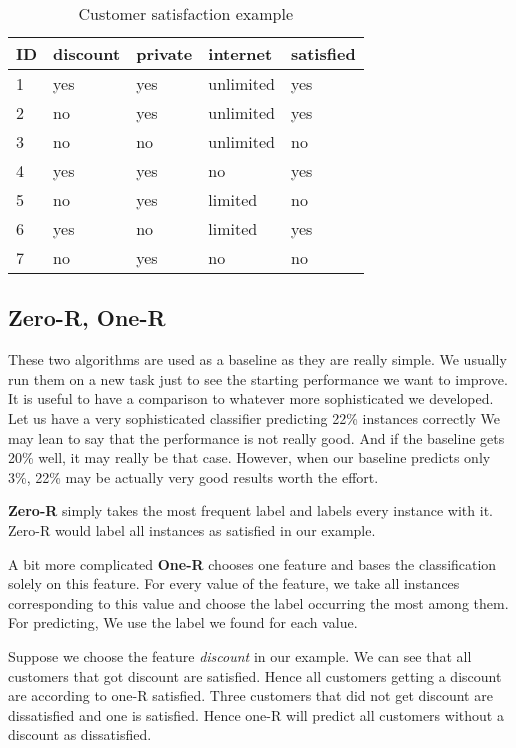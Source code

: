 \begin{table}[h!]

\centering
\begin{tabular}{lllll}
\toprule
\textbf{ID} & \textbf{discount} & \textbf{private} & \textbf{internet} \hspace{1.cm} & \textbf{satisfied} \\
\midrule
1 & yes & yes & unlimited & yes \\
2 & no & yes & unlimited & yes \\
3 & no & no & unlimited & no \\
4 & yes & yes & no & yes \\
5 & no & yes & limited & no \\
6 & yes & no & limited & yes \\
7 & no & yes & no & no \\
\bottomrule
\end{tabular}

\caption{Customer satisfaction example}\label{tab:custsatis}
\end{table}






\subsection{Zero-R, One-R}

These two algorithms are used as a baseline as they are really simple.
We usually run them on a new task just to see the starting performance we want to improve.
It is useful to have a comparison to whatever more sophisticated we developed.
Let us have a very sophisticated classifier predicting 22\% instances correctly
We may lean to say that the performance is not really good.
And if the baseline gets 20\% well, it may really be that case.
However, when our baseline predicts only 3\%, 22\% may be actually very good results worth the effort.

{\bf Zero-R} simply takes the most frequent label and labels every instance with it.
Zero-R would label all instances as satisfied in our example.

A bit more complicated {\bf One-R} chooses one feature and bases the classification solely on this feature.
For every value of the feature, we take all instances corresponding to this value and choose the label occurring the most among them.
For predicting, We use the label we found for each value.

Suppose we choose the feature {\it discount} in our example.
We can see that all customers that got discount are satisfied.
Hence all customers getting a discount are according to one-R satisfied.
Three customers that did not get discount are dissatisfied and one is satisfied.
Hence one-R will predict all customers without a discount as dissatisfied.

